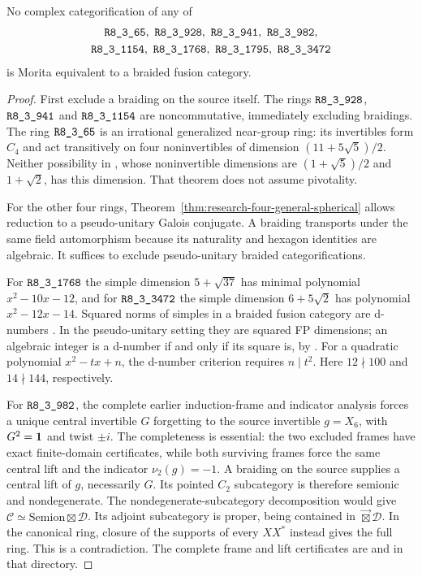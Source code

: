 \begin{theorem}
\label{thm:research-no-braided-morita}
No complex categorification of any of
\[
\begin{gathered}
\sha{R8_3_65},\ \sha{R8_3_928},\ \sha{R8_3_941},\ \sha{R8_3_982},\\
\sha{R8_3_1154},\ \sha{R8_3_1768},\ \sha{R8_3_1795},\ \sha{R8_3_3472}
\end{gathered}
\]
is Morita equivalent to a braided fusion category.
\end{theorem}
\begin{proof}
First exclude a braiding on the source itself.
The rings $\sha{R8_3_928}$, $\sha{R8_3_941}$ and
$\sha{R8_3_1154}$ are noncommutative, immediately excluding braidings.
The ring $\sha{R8_3_65}$ is an irrational generalized near-group
ring: its invertibles form $C_4$ and act transitively on four
noninvertibles of dimension $(11+5\sqrt5)/2$.  Neither possibility
in \cite[Theorem~1]{SchopierayBraidedGNG}, whose noninvertible
dimensions are $(1+\sqrt5)/2$ and $1+\sqrt2$, has this dimension.
That theorem does not assume pivotality.

For the other four rings, Theorem~\ref{thm:research-four-general-spherical}
allows reduction to a pseudo-unitary Galois conjugate.  A braiding
transports under the same field automorphism because its naturality
and hexagon identities are algebraic.  It suffices to exclude
pseudo-unitary braided categorifications.

For $\sha{R8_3_1768}$ the simple dimension $5+\sqrt{37}$ has
minimal polynomial $x^2-10x-12$, and for $\sha{R8_3_3472}$ the
simple dimension $6+5\sqrt2$ has polynomial $x^2-12x-14$.
Squared norms of simples in a braided fusion category are d-numbers
\cite[Theorem~1.8]{OstrikCode}.  In the pseudo-unitary setting they
are squared FP dimensions; an algebraic integer is a d-number if and
only if its square is, by \cite[Corollary~2.9]{OstrikCode}.
For a quadratic polynomial $x^2-tx+n$, the d-number criterion
\cite[Lemma~2.7(v)]{OstrikCode} requires $n\mid t^2$.
Here $12\nmid100$ and $14\nmid144$, respectively.

For $\sha{R8_3_982}$, the complete earlier induction-frame and
indicator analysis forces a unique central invertible $G$ forgetting
to the source invertible $g=X_6$, with $G^2=\mathbf1$ and twist $\pm i$.
The completeness is essential: the two excluded frames have exact
finite-domain certificates, while both surviving frames force the
same central lift and the indicator $\nu_2(g)=-1$.
A braiding on the source supplies a central lift of $g$, necessarily
$G$.  Its pointed $C_2$ subcategory is therefore semionic and
nondegenerate.  The nondegenerate-subcategory decomposition
\cite[Theorem~3.13]{DGNO} would give
$\mathcal C\simeq\mathrm{Semion}\boxtimes\mathcal D$.
Its adjoint subcategory is proper, being contained in
$\Vec\boxtimes\mathcal D$.  In the canonical ring, closure of the
supports of every $XX^*$ instead gives the full ring.  This is a
contradiction.  The complete frame and lift certificates are
 and
 in that directory.


\end{proof}
